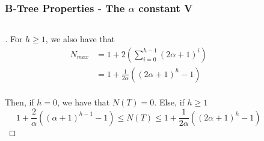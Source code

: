 \documentclass{beamer}
\begin{document}
\begin{frame}
    \frametitle{B-Tree Properties - The \(\alpha\) constant V}
    \begin{columns}
        \begin{column}{\textlecolumn}
            \begin{block}{}
                \begin{proof}[\unskip\nopunct]
                    For \(h \geq 1\), we also have that
                    \[
                        \begin{aligned}
                            N_{max} &= 1 + 2\left(\sum^{h - 1}_{i = 0} \left(2\alpha + 1\right)^i \right) \\
                            &= 1 + \frac{1}{2\alpha}\left(\left(2\alpha + 1\right)^{h} - 1\right)
                        \end{aligned}
                    \]
                    \\
                    Then, if \(h = 0\), we have that \(N\left(T\right) = 0\). Else, if \(h \geq 1\)
                    \[
                        1 + \frac{2}{\alpha}\left(\left(\alpha + 1\right)^{h - 1} - 1\right) \leq N\left(T\right) \leq 1 + \frac{1}{2\alpha}\left(\left(2\alpha + 1\right)^{h} - 1\right)
                    \]
                \end{proof}
            \end{block}
        \end{column}
        \begin{column}{\textricolumn}
        \end{column}
    \end{columns}
\end{frame}
\end{document}
